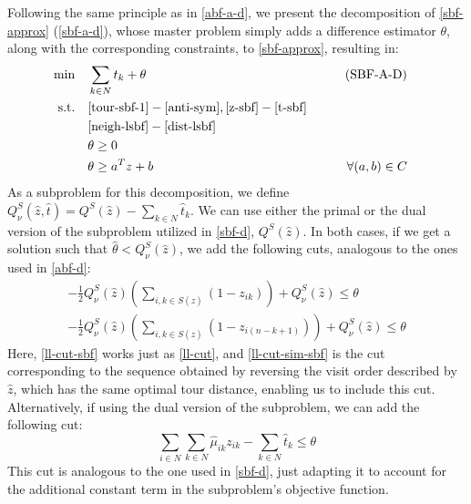 \documentclass[pdflatex,sn-mathphys-num]{sn-jnl}%
\begin{document}
Following the same principle as in \ref{abf-a-d}, we present the decomposition of \ref{sbf-approx} (\ref{sbf-a-d}), whose master problem simply adds a difference estimator $\theta$, along with the corresponding constraints, to \ref{sbf-approx}, resulting in:
\begin{subequations} 
\begin{align}
\min &&& \sum_{k \in N} t_k +\theta & \tag{SBF-A-D} \label{sbf-a-d}\\
\text{s.t.} &&&\eqref{tour-sbf-1}-\eqref{anti-sym}, \eqref{z-sbf}-\eqref{t-sbf}& \nonumber  \\
&&& \eqref{neigh-lsbf}-\eqref{dist-lsbf} & \nonumber \\
&&& \theta \geq 0 & \label{theta-lb-sbf-ext-d}\\
&&& \theta \geq a^Tz + b & \forall (a,b) \in C & \label{theta-estim-sbf-ext-d}
\end{align}
\end{subequations}
As a subproblem for this decomposition, we define $Q_\nu^S(\hat{z},\hat{t}) = Q^S(\hat{z}) - \sum_{k\in N} \hat{t}_k$. We can use either the primal or the dual version of the subproblem utilized in \ref{sbf-d}, $Q^S(\hat{z})$. In both cases, if we get a solution such that $\hat{\theta} < Q^S_\nu(\hat{z})$, we add the following cuts, analogous to the ones used in \ref{abf-d}:
\begin{subequations}
\begin{gather}
        -\frac{1}{2}Q^S_\nu(\hat{z})\left(\sum_{i,k \in S(\hat{z})} (1 - z_{ik})\right) + Q^S_\nu(\hat{z}) \leq \theta \label{ll-cut-sbf}\\
     -\frac{1}{2}Q^S_\nu(\hat{z})\left(\sum_{i,k \in S(\hat{z})} (1 - z_{i(n-k+1)})\right) + Q^S_\nu(\hat{z}) \leq \theta \label{ll-cut-sim-sbf}
\end{gather}
\end{subequations}
Here, \eqref{ll-cut-sbf} works just as \eqref{ll-cut}, and \eqref{ll-cut-sim-sbf} is the cut corresponding to the sequence obtained by reversing the visit order described by $\hat{z}$, which has the same optimal tour distance, enabling us to include this cut. Alternatively, if using the dual version of the subproblem, we can add the following cut:
\begin{equation}
    \sum_{i \in N}\sum_{k \in N} \hat{\mu}_{ik} z_{ik} - \sum_{k \in N} \hat{t}_k \leq \theta \label{dual-cut-sbf}
\end{equation}
This cut is analogous to the one used in \ref{sbf-d}, just adapting it to account for the additional constant term in the subproblem's objective function.
\end{document}
